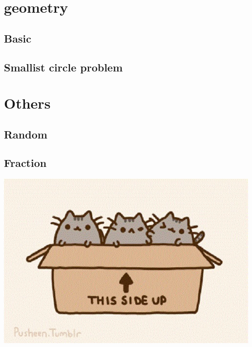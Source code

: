 \documentclass[12pt,twocolumn,oneside,a4paper]{article}
\begin{document}
\section{geometry}
\subsection{Basic}


\subsection{Smallist circle problem}


\section{Others}
\subsection{Random}


\subsection{Fraction}


\includegraphics{meow}
\end{document}
